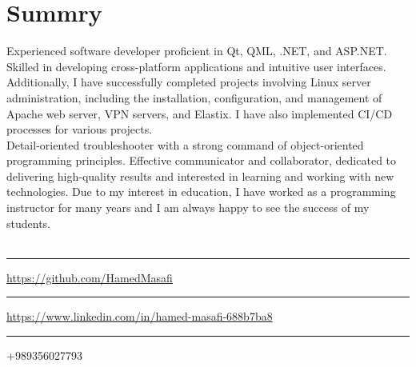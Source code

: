 \section{Summry}
Experienced software developer proficient in Qt, QML, .NET, and ASP.NET. Skilled in developing cross-platform applications and intuitive user interfaces. Additionally, I have successfully completed projects involving Linux server administration, including the installation, configuration, and management of Apache web server, VPN servers, and Elastix. I have also implemented CI/CD processes for various projects.
\\
Detail-oriented troubleshooter with a strong command of object-oriented programming principles. Effective communicator and collaborator, dedicated to delivering high-quality results and interested in learning and working with new technologies. Due to my interest in education, I have worked as a programming instructor for many years and I am always happy to see the success of my students.
\\
\\
\faGithub\rule{0.5cm}{0pt}\url{https://github.com/HamedMasafi}
\\
\faLinkedin\rule{0.5cm}{0pt}\url{https://www.linkedin.com/in/hamed-masafi-688b7ba8}
\\
\faPhone\rule{0.5cm}{0pt}+989356027793
